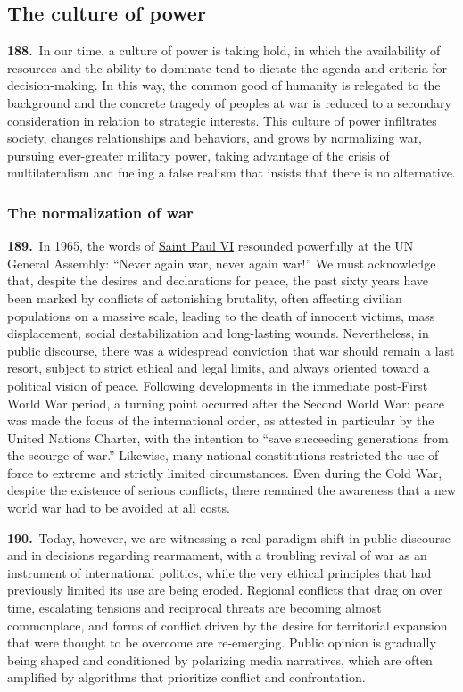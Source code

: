 \documentclass{article}
\begin{document}
\subsection{The culture of power}

\textbf{188.}\ In our time, a culture of power is taking hold, in which the availability of resources and the ability to dominate tend to dictate the agenda and criteria for decision-making. In this way, the common good of humanity is relegated to the background and the concrete tragedy of peoples at war is reduced to a secondary consideration in relation to strategic interests. This culture of power infiltrates society, changes relationships and behaviors, and grows by normalizing war, pursuing ever-greater military power, taking advantage of the crisis of multilateralism and fueling a false realism that insists that there is no alternative.

\subsubsection{The normalization of war}

\textbf{189.}\ In 1965, the words of \href{https://www.vatican.va/content/paul-vi/en.html}{Saint Paul VI} resounded powerfully at the UN General Assembly: ``Never again war, never again war!''\cite{n180} We must acknowledge that, despite the desires and declarations for peace, the past sixty years have been marked by conflicts of astonishing brutality, often affecting civilian populations on a massive scale, leading to the death of innocent victims, mass displacement, social destabilization and long-lasting wounds. Nevertheless, in public discourse, there was a widespread conviction that war should remain a last resort, subject to strict ethical and legal limits, and always oriented toward a political vision of peace. Following developments in the immediate post-First World War period, a turning point occurred after the Second World War: peace was made the focus of the international order, as attested in particular by the United Nations Charter, with the intention to ``save succeeding generations from the scourge of war.''\cite{n181} Likewise, many national constitutions restricted the use of force to extreme and strictly limited circumstances. Even during the Cold War, despite the existence of serious conflicts, there remained the awareness that a new world war had to be avoided at all costs.

\textbf{190.}\ Today, however, we are witnessing a real paradigm shift in public discourse and in decisions regarding rearmament, with a troubling revival of war as an instrument of international politics, while the very ethical principles that had previously limited its use are being eroded. Regional conflicts that drag on over time, escalating tensions and reciprocal threats are becoming almost commonplace, and forms of conflict driven by the desire for territorial expansion that were thought to be overcome are re-emerging. Public opinion is gradually being shaped and conditioned by polarizing media narratives, which are often amplified by algorithms that prioritize conflict and confrontation.
\end{document}
